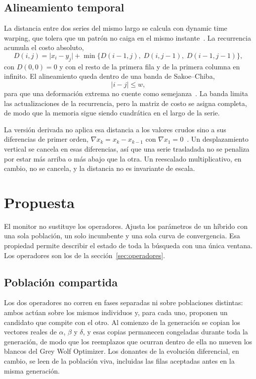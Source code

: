 \documentclass[runningheads]{llncs}
\begin{document}
\subsection{Alineamiento temporal}
\label{sec:alineamiento}

La distancia entre dos series del mismo largo se calcula con dynamic time warping, que tolera que un patrón no caiga en el mismo instante~\cite{berndt1994using}. La recurrencia acumula el costo absoluto,
\begin{equation}
D(i,j) = \bigl|x_i - y_j\bigr| + \min\bigl\{D(i-1,j),\; D(i,j-1),\; D(i-1,j-1)\bigr\},
\label{eq:dtw}
\end{equation}
con $D(0,0) = 0$ y con el resto de la primera fila y de la primera columna en infinito. El alineamiento queda dentro de una banda de Sakoe--Chiba,
\begin{equation}
|i-j| \le w,
\label{eq:banda}
\end{equation}
para que una deformación extrema no cuente como semejanza~\cite{sakoe1978dynamic}. La banda limita las actualizaciones de la recurrencia, pero la matriz de costo se asigna completa, de modo que la memoria sigue siendo cuadrática en el largo de la serie.

La versión derivada no aplica esa distancia a los valores crudos sino a sus diferencias de primer orden, $\nabla x_k = x_k - x_{k-1}$ con $\nabla x_1 = 0$~\cite{keogh2001derivative}. Un desplazamiento vertical se cancela en esas diferencias, así que una serie trasladada no se penaliza por estar más arriba o más abajo que la otra. Un reescalado multiplicativo, en cambio, no se cancela, y la distancia no es invariante de escala.

\section{Propuesta}
\label{sec:propuesta}
\label{sec:monitor}

El monitor no sustituye los operadores. Ajusta los parámetros de un híbrido con una sola población, un solo incumbente y una sola curva de convergencia. Esa propiedad permite describir el estado de toda la búsqueda con una única ventana. Los operadores son los de la sección~\ref{sec:operadores}.

\subsection{Población compartida}
\label{sec:poblacion}

Los dos operadores no corren en fases separadas ni sobre poblaciones distintas: ambos actúan sobre los mismos individuos y, para cada uno, proponen un candidato que compite con el otro. Al comienzo de la generación se copian los vectores reales de $\alpha$, $\beta$ y $\delta$, y esas copias permanecen congeladas durante toda la generación, de modo que los reemplazos que ocurran dentro de ella no mueven los blancos del Grey Wolf Optimizer. Los donantes de la evolución diferencial, en cambio, se leen de la población viva, incluidas las filas aceptadas antes en la misma generación.
\end{document}
